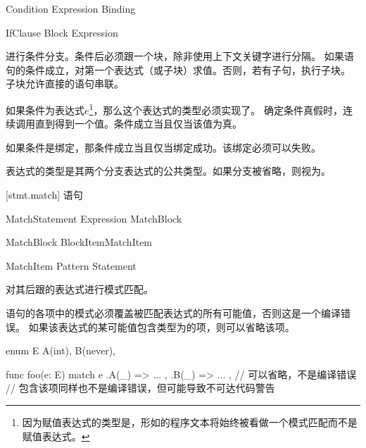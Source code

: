 \begin{bnf}{Condition}
    Expression \br
    Binding
\end{bnf}

\begin{bnf}{IfClause}
    Block \br
     Expression
\end{bnf}

\pnum
{}进行条件分支。条件后必须跟一个块，除非使用上下文关键字进行分隔。
如果语句的条件成立，对第一个表达式（或子块）求值。否则，若有子句，执行子块。
子块允许直接的语句串联。

\pnum
如果条件为表达式$e$\footnote{因为赋值表达式的类型是，形如的程序文本将始终被看做一个模式匹配而不是赋值表达式。}，那么这个表达式的类型必须实现了。
确定条件真假时，连续调用直到得到一个值。条件成立当且仅当该值为真。

\pnum
如果条件是绑定，那条件成立当且仅当绑定成功。该绑定必须可以失败。

\pnum
{}表达式的类型是其两个分支表达式的公共类型。如果分支被省略，则视为。

[stmt.match]{ 语句}

\begin{bnf}{MatchStatement}
     Expression MatchBlock
\end{bnf}

\begin{bnf}{MatchBlock}
    \terminal{\{} BlockItem\bnfs MatchItem\bnfp \terminal{\}}
\end{bnf}

\begin{bnf}{MatchItem}
    Pattern \terminal{->} Statement
\end{bnf}

\pnum
{}对其后跟的表达式进行模式匹配。

\pnum
{}语句的各项中的模式必须覆盖被匹配表达式的所有可能值，否则这是一个编译错误。
如果该表达式的某可能值包含类型为的项，则可以省略该项。

\enterexample
\begin{codeblock}

enum E {
    A(int),
    B(never),
}

func foo(e: E) {
    match e {
        .A(_) => { ... },
        .B(_) => { ... }, // 可以省略，不是编译错误
                          // 包含该项同样也不是编译错误，但可能导致不可达代码警告
    }
}

\end{codeblock}
\exitexample

